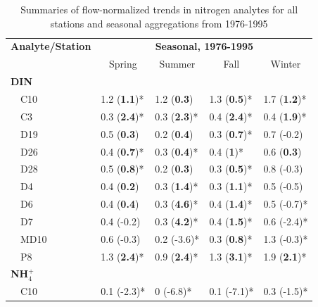 \documentclass[letterpaper,12pt,oneside]{article}\usepackage[]{graphicx}\usepackage[]{color}
\begin{document}
\begin{table}[!tbp]
\caption{Summaries of flow-normalized trends in nitrogen analytes for all stations and seasonal aggregations from 1976-1995\label{tab:trndsbef}} 
\begin{center}
\begin{tabular}{lllll}
\hline\hline
\multicolumn{1}{l}{\bfseries Analyte/Station}&\multicolumn{4}{c}{\bfseries Seasonal, 1976-1995}\tabularnewline
\cline{2-5}
\multicolumn{1}{l}{}&\multicolumn{1}{c}{Spring}&\multicolumn{1}{c}{Summer}&\multicolumn{1}{c}{Fall}&\multicolumn{1}{c}{Winter}\tabularnewline
\hline
{\bfseries DIN}&&&&\tabularnewline
~~C10&1.2 \footnotesize{(\textbf{1.1})*}&1.2 \footnotesize{(\textbf{0.3})}&1.3 \footnotesize{(\textbf{0.5})*}&1.7 \footnotesize{(\textbf{1.2})*}\tabularnewline
~~C3&0.3 \footnotesize{(\textbf{2.4})*}&0.3 \footnotesize{(\textbf{2.3})*}&0.4 \footnotesize{(\textbf{2.4})*}&0.4 \footnotesize{(\textbf{1.9})*}\tabularnewline
~~D19&0.5 \footnotesize{(\textbf{0.3})}&0.2 \footnotesize{(\textbf{0.4})}&0.3 \footnotesize{(\textbf{0.7})*}&0.7 \footnotesize{(-0.2)}\tabularnewline
~~D26&0.4 \footnotesize{(\textbf{0.7})*}&0.3 \footnotesize{(\textbf{0.4})*}&0.4 \footnotesize{(\textbf{1})*}&0.6 \footnotesize{(\textbf{0.3})}\tabularnewline
~~D28&0.5 \footnotesize{(\textbf{0.8})*}&0.2 \footnotesize{(\textbf{0.3})}&0.3 \footnotesize{(\textbf{0.5})*}&0.8 \footnotesize{(-0.3)}\tabularnewline
~~D4&0.4 \footnotesize{(\textbf{0.2})}&0.3 \footnotesize{(\textbf{1.4})*}&0.3 \footnotesize{(\textbf{1.1})*}&0.5 \footnotesize{(-0.5)}\tabularnewline
~~D6&0.4 \footnotesize{(\textbf{0.4})}&0.3 \footnotesize{(\textbf{4.6})*}&0.4 \footnotesize{(\textbf{1.4})*}&0.5 \footnotesize{(-0.7)*}\tabularnewline
~~D7&0.4 \footnotesize{(-0.2)}&0.3 \footnotesize{(\textbf{4.2})*}&0.4 \footnotesize{(\textbf{1.5})*}&0.6 \footnotesize{(-2.4)*}\tabularnewline
~~MD10&0.6 \footnotesize{(-0.3)}&0.2 \footnotesize{(-3.6)*}&0.3 \footnotesize{(\textbf{0.8})*}&1.3 \footnotesize{(-0.3)*}\tabularnewline
~~P8&1.3 \footnotesize{(\textbf{2.4})*}&0.9 \footnotesize{(\textbf{2.4})*}&1.3 \footnotesize{(\textbf{3.1})*}&1.9 \footnotesize{(\textbf{2.1})*}\tabularnewline
\hline
{\bfseries NH$_{4}^{+}$}&&&&\tabularnewline
~~C10&0.1 \footnotesize{(-2.3)*}&0 \footnotesize{(-6.8)*}&0.1 \footnotesize{(-7.1)*}&0.3 \footnotesize{(-1.5)*}\tabularnewline

\end{tabular}
\end{center}
\end{table}
\end{document}
